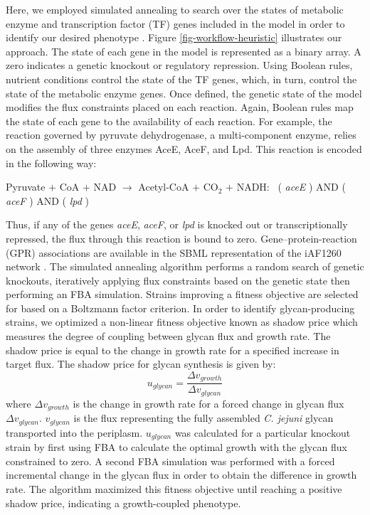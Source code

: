 \documentclass[12pt]{article}
\begin{document}
Here, we employed simulated annealing to search over the states of metabolic enzyme and transcription factor (TF) genes included in the model in order to identify our desired phenotype \cite{1983-kirkpatrick-vecchi-Sci}. 
Figure \ref{fig-workflow-heuristic} illustrates our approach. 
The state of each gene in the model is represented as a binary array. 
A zero indicates a genetic knockout or regulatory repression. 
Using Boolean rules, nutrient conditions control the state of the TF genes, which, in turn, control the state of the metabolic enzyme genes. 
Once defined, the genetic state of the model modifies the flux constraints placed on each reaction. 
Again, Boolean rules map the state of each gene to the availability of each reaction. 
For example, the reaction governed by pyruvate dehydrogenase, a multi-component enzyme, relies on the assembly of three enzymes AceE, AceF, and Lpd. 
This reaction is encoded in the following way:
\begin{center}
\begin{footnotesize}
Pyruvate $+$ CoA $+$ NAD $\longrightarrow$ Acetyl-CoA $+$ CO$_2$ $+$ NADH: $\,$ ( \textit{aceE} ) AND ( \textit{aceF} ) AND ( \textit{lpd} )
\end{footnotesize}
\end{center}
Thus, if any of the genes \textit{aceE}, \textit{aceF}, or \textit{lpd} is knocked out or transcriptionally repressed, the flux through this reaction is bound to zero. 
Gene–protein-reaction (GPR) associations are available in the SBML representation of the iAF1260 network \cite{2007-feist-reed-hatzimanikatis-palsson-MolSysBio}. 
The simulated annealing algorithm performs a random search of genetic knockouts, iteratively applying flux constraints based on the genetic state then performing an FBA simulation. 
Strains improving a fitness objective are selected for based on a Boltzmann factor criterion. 
In order to identify glycan-producing strains, we optimized a non-linear fitness objective known as shadow price which measures the degree of coupling between glycan flux and growth rate. 
The shadow price is equal to the change in growth rate for a specified increase in target flux. 
The shadow price for glycan synthesis is given by: 
\begin{equation}
\label{eqn-shadow-price}
u_{glycan} = \frac{ \Delta v_{growth} }{ \Delta v_{glycan} }
\end{equation}
where $\Delta v_{growth}$ is the change in growth rate for a forced change in glycan flux $\Delta v_{glycan}$. 
$v_{glycan}$ is the flux representing the fully assembled \textit{C. jejuni} glycan transported into the periplasm. 
$u_{glycan}$ was calculated for a particular knockout strain by first using FBA to calculate the optimal growth with the glycan flux constrained to zero. 
A second FBA simulation was performed with a forced incremental change in the glycan flux in order to obtain the difference in growth rate. 
The algorithm maximized this fitness objective until reaching a positive shadow price, indicating a growth-coupled phenotype. 
\end{document}
